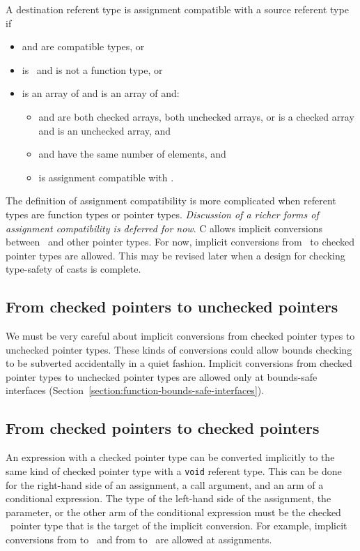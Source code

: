 A destination referent type  is assignment compatible with a source referent
type  if
\begin{itemize}
\item {} and  are compatible types, or
\item {} is \void\ and  is not a function type, or
\item {} is an array of  and  is an array of 
and:
\begin{itemize}
\item {} and  are both checked arrays, both unchecked arrays, or
 is a checked array and  is an unchecked array, and
\item {} and  have the same number of elements, and
\item {} is assignment compatible with .
\end{itemize}
\end{itemize}
The definition of assignment compatibility is more
complicated when referent types are function types or
pointer types. {\em Discussion of a richer forms of assignment compatibility
is deferred for now}.
C allows implicit conversions between \uncheckedptrvoid\ and other pointer
types. For now, implicit conversions from \uncheckedptrvoid\ to checked pointer
types are allowed. This may be revised later when a design
for checking type-safety of casts is complete.

\subsection{From checked pointers to unchecked pointers}

We must be very careful about implicit conversions from checked pointer
types to unchecked pointer types.  These kinds of conversions could allow bounds checking to
be subverted accidentally in a quiet fashion. Implicit conversions from checked pointer types to
unchecked pointer types are allowed only at bounds-safe interfaces
(Section~\ref{section:function-bounds-safe-interfaces}).

\subsection{From checked pointers to checked pointers}

An expression with a checked pointer type can be converted implicitly to the same kind
of checked pointer type with a \texttt{void} referent type.
This can be done for the right-hand side of an assignment, a call argument, 
and an arm of a conditional expression.  
The type of the left-hand side of the assignment, the parameter, or the other
arm of the conditional expression
must be the checked \void\ pointer type that is the target of the implicit
conversion. For example, implicit conversions from 
 to \ptrvoid\ and from  to \arrayptrvoid\ are allowed 
at assignments. 

